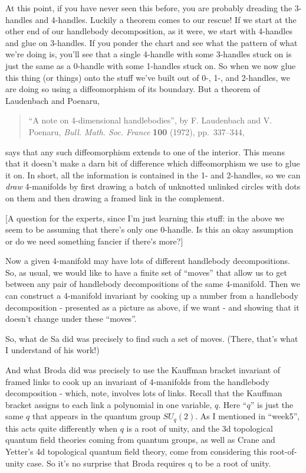 \documentclass{article}
\begin{document}
At this point, if you have never seen this before, you are probably
dreading the 3-handles and 4-handles. Luckily a theorem comes to our
rescue! If we start at the other end of our handlebody decomposition, as
it were, we start with 4-handles and glue on 3-handles. If you ponder
the chart and see what the pattern of what we're doing is, you'll see
that a single 4-handle with some 3-handles stuck on is just the same as
a 0-handle with some 1-handles stuck on. So when we now glue this thing
(or things) onto the stuff we've built out of 0-, 1-, and 2-handles, we
are doing so using a diffeomorphism of its boundary. But a theorem of
Laudenbach and Poenaru,

\begin{quote}
``A note on 4-dimensional handlebodies'', by F. Laudenbach and V.
Poenaru, \emph{Bull. Math. Soc. France} \textbf{100} (1972),
pp.~337--344,
\end{quote}

says that any such diffeomorphism extends to one of the interior. This
means that it doesn't make a darn bit of difference which diffeomorphism
we use to glue it on. In short, all the information is contained in the
1- and 2-handles, so we can \emph{draw} 4-manifolds by first drawing a
batch of unknotted unlinked circles with dots on them and then drawing a
framed link in the complement.

{[}A question for the experts, since I'm just learning this stuff: in
the above we seem to be assuming that there's only one 0-handle. Is this
an okay assumption or do we need something fancier if there's more?{]}

Now a given 4-manifold may have lots of different handlebody
decompositions. So, as usual, we would like to have a finite set of
``moves'' that allow us to get between any pair of handlebody
decompositions of the same 4-manifold. Then we can construct a
4-manifold invariant by cooking up a number from a handlebody
decomposition - presented as a picture as above, if we want - and
showing that it doesn't change under these ``moves''.

So, what de Sa did was precisely to find such a set of moves. (There,
that's what I understand of his work!)

And what Broda did was precisely to use the Kauffman bracket invariant
of framed links to cook up an invariant of 4-manifolds from the
handlebody decomposition - which, note, involves lots of links. Recall
that the Kauffman bracket assigns to each link a polynomial in one
variable, \(q\). Here ``\(q\)'' is just the same \(q\) that appears in
the quantum group \(SU_q(2)\). As I mentioned in ``week5'', this acts
quite differently when \(q\) is a root of unity, and the 3d topological
quantum field theories coming from quantum groups, as well as Crane and
Yetter's 4d topological quantum field theory, come from considering this
root-of-unity case. So it's no surprise that Broda requires q to be a
root of unity.
\end{document}
